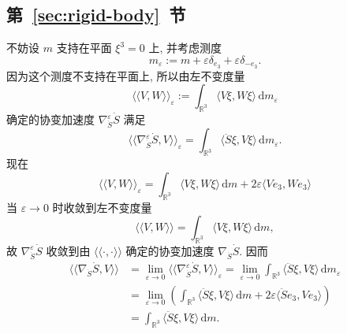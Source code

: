 \subsection{\texorpdfstring{第~\ref{sec:rigid-body}~节}{刚体}}\label{subsec:solutions-rigid-body}

\begin{description}[font=\normalfont,leftmargin=2em,labelwidth=1.5em]
不妨设 $m$ 支持在平面 $\xi^3=0$ 上, 并考虑测度
\[
  m_\varepsilon:=m+\varepsilon\delta_{e_3}+\varepsilon\delta_{-e_3}.
\]
因为这个测度不支持在平面上, 所以由左不变度量
\[
  \langle\!\langle V,W\rangle\!\rangle_\varepsilon
    :=\int_{\mathbb{R}^3}\langle V\xi,W\xi\rangle\,\mathrm{d}m_\varepsilon
\]
确定的协变加速度 $\nabla^\varepsilon_{\dot S}\dot S$ 满足
\[
  \langle\!\langle\nabla^\varepsilon_{\dot S}\dot S,V\rangle\!\rangle_\varepsilon
    =\int_{\mathbb{R}^3}\langle\ddot S\xi,V\xi\rangle\,\mathrm{d}m_\varepsilon.
\]
现在
\[
  \langle\!\langle V,W\rangle\!\rangle_\varepsilon
  =\int_{\mathbb{R}^3}\langle V\xi,W\xi\rangle\,\mathrm{d}m
    +2\varepsilon\langle Ve_3,We_3\rangle
\]
当 $\varepsilon\to0$ 时收敛到左不变度量
\[
  \langle\!\langle V,W\rangle\!\rangle=\int_{\mathbb{R}^3}\langle V\xi,W\xi\rangle\,\mathrm{d}m,
\]
故 $\nabla^\varepsilon_{\dot S}\dot S$ 收敛到由 $\langle\!\langle\cdot,\cdot\rangle\!\rangle$ 确定的协变加速度 $\nabla_{\dot S}\dot S$. 因而
\begin{align*}
  \langle\!\langle\nabla_{\dot S}\dot S,V\rangle\!\rangle
  &=\lim_{\varepsilon\to0}\langle\!\langle\nabla^\varepsilon_{\dot S}\dot S,V\rangle\!\rangle_\varepsilon
    =\lim_{\varepsilon\to0}\int_{\mathbb{R}^3}\langle\ddot S\xi,V\xi\rangle\,\mathrm{d}m_\varepsilon\\
  &=\lim_{\varepsilon\to0}\left(\int_{\mathbb{R}^3}\langle\ddot S\xi,V\xi\rangle\,\mathrm{d}m
                +2\varepsilon\langle\ddot Se_3,Ve_3\rangle\right)\\
  &=\int_{\mathbb{R}^3}\langle\ddot S\xi,V\xi\rangle\,\mathrm{d}m.
\end{align*}


\end{description}
